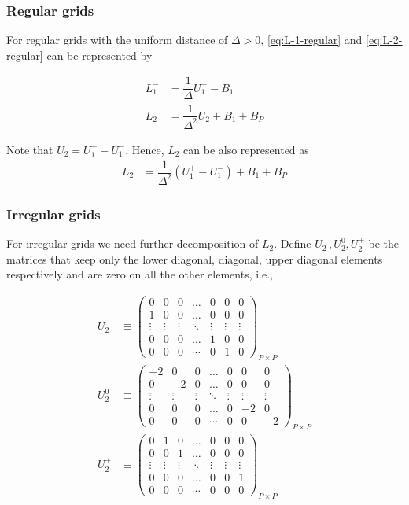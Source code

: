 \documentclass[11pt]{article}
\begin{document}
\subsubsection{Regular grids}
For regular grids with the uniform distance of $\Delta > 0$, \eqref{eq:L-1-regular} and \eqref{eq:L-2-regular} can be represented by

\begin{align}
L_1^{-} &= \dfrac{1}{\Delta} U_1^{-} - B_1 \\
L_2 &= \dfrac{1}{\Delta^2} U_2 + B_1 + B_P
\end{align}

Note that $U_2 = U_1^+ - U_1^-$. Hence, $L_2$ can be also represented as
\begin{align}
L_2 &= \dfrac{1}{\Delta^2} (U_1^+ - U_1^-) + B_1 + B_P
\end{align}

\subsubsection{Irregular grids}
For irregular grids we need further decomposition of $L_2$. Define $U_2^-, U_2^0, U_2^+$ be the matrices that keep only the lower diagonal, diagonal, upper diagonal elements respectively and are zero on all the other elements, i.e.,

\begin{align}
U_2^- &\equiv \begin{pmatrix}
0&0&0&\dots&0&0&0\\
1&0&0&\dots&0&0&0\\
\vdots&\vdots&\vdots&\ddots&\vdots&\vdots&\vdots\\
0&0&0&\dots&1&0&0\\
0&0&0&\cdots&0&1&0
\end{pmatrix}_{P\times P} \\
U_2^0 &\equiv \begin{pmatrix}
-2 &0&0&\dots&0&0&0\\
0&-2&0&\dots&0&0&0\\
\vdots&\vdots&\vdots&\ddots&\vdots&\vdots&\vdots\\
0&0&0&\dots&0&-2&0\\
0&0&0&\cdots&0&0&-2 
\end{pmatrix}_{P\times P} \\
U_2^+ &\equiv \begin{pmatrix}
0&1&0&\dots&0&0&0\\
0&0&1&\dots&0&0&0\\
\vdots&\vdots&\vdots&\ddots&\vdots&\vdots&\vdots\\
0&0&0&\dots&0&0&1\\
0&0&0&\cdots&0&0&0 
\end{pmatrix}_{P\times P}
\end{align}
\end{document}
